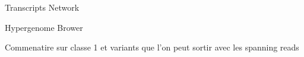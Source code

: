\documentclass[a4paper]{article}
\newcommand{\nbsamples}{44\xspace}
\newcommand{\crac}{CRAC\xspace}
\newcommand{\chimct}{chimCT\xspace}
\begin{document}
Transcripts Network

Hypergenome Brower

Commenatire sur classe 1 et variants que l’on peut sortir avec les spanning reads

%
%
%
%
\end{document}
